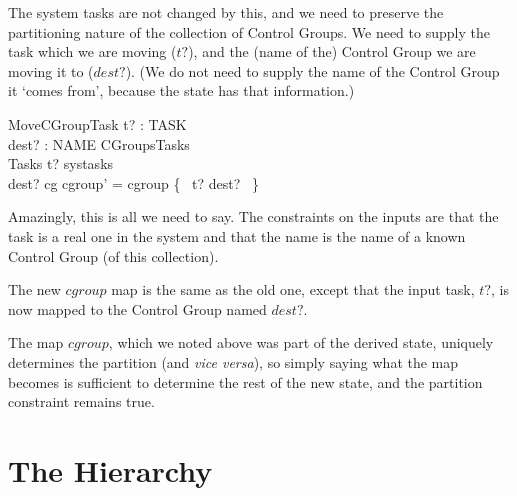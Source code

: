 \documentclass[a4paper,twoside,12pt]{article}
\begin{document}
The system tasks are not changed by this, and we need to preserve the partitioning nature of the collection of Control Groups. We need to supply the task which we are moving ($t?$), and the (name of the) Control Group we are moving it to ($dest?$). (We do not need to supply the name of the Control Group it `comes from', because the state has that information.)

\begin{schema}{MoveCGroupTask}
t? : TASK \\
dest? : NAME
\also
\Delta CGroupsTasks \\
\Xi Tasks 
\where
t? \in systasks \\
dest? \in \dom cg
\also
cgroup' = cgroup \oplus \{ ~t? \mapsto dest? ~\}
\end{schema}
Amazingly, this is all we need to say.  The constraints on the inputs are that the task is a real one in the system and that the name is the name of a known Control Group (of this collection).

The new $cgroup$ map is the same as the old one, except that the input task, $t?$, is now mapped to the Control Group named $dest?$.

The map $cgroup$, which we noted above was part of the derived state, uniquely determines the partition (and \emph{vice versa}), so simply saying what the map becomes is sufficient to determine the rest of the new state, and the partition constraint remains true.

\section{The Hierarchy}
\end{document}
